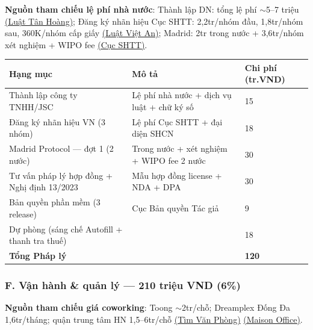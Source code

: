 \documentclass[11pt,a4paper]{article}
\begin{document}
\textbf{Nguồn tham chiếu lệ phí nhà nước}: Thành lập DN: tổng lệ phí $\sim$5--7 triệu \href{https://luattanhoang.com/chi-phi-thanh-lap-cong-ty.html}{(Luật Tân Hoàng)}; Đăng ký nhãn hiệu Cục SHTT: 2,2tr/nhóm đầu, 1,8tr/nhóm sau, 360K/nhóm cấp giấy \href{https://luatvietan.vn/le-phi-nop-don-dang-ky-nhan-hieu.html}{(Luật Việt An)}; Madrid: 2tr trong nước + 3,6tr/nhóm xét nghiệm + WIPO fee \href{https://ipvietnam.gov.vn/en/nhan-hieu}{(Cục SHTT)}.

\begin{longtable}{|L{4cm}|L{6cm}|R{2.2cm}|}
\hline
{}\textbf{Hạng mục} & \textbf{Mô tả} & \textbf{Chi phí (tr.VND)} \\
\hline\endhead

Thành lập công ty TNHH/JSC & Lệ phí nhà nước + dịch vụ luật + chữ ký số & 15 \\ \hline
Đăng ký nhãn hiệu VN (3 nhóm) & Lệ phí Cục SHTT + đại diện SHCN & 18 \\ \hline
Madrid Protocol --- đợt 1 (2 nước) & Trong nước + xét nghiệm + WIPO fee 2 nước & 30 \\ \hline
Tư vấn pháp lý hợp đồng + Nghị định 13/2023 & Mẫu hợp đồng license + NDA + DPA & 30 \\ \hline
Bản quyền phần mềm (3 release) & Cục Bản quyền Tác giả & 9 \\ \hline
Dự phòng (sáng chế Autofill + thanh tra thuế) & & 18 \\ \hline
\textbf{Tổng Pháp lý} & & \textbf{120} \\ \hline

\end{longtable}

\subsubsection{F. Vận hành \& quản lý --- 210 triệu VND (6\%)}

\textbf{Nguồn tham chiếu giá coworking}: Toong $\sim$2tr/chỗ; Dreamplex Đống Đa 1,6tr/tháng; quận trung tâm HN 1,5--6tr/chỗ \href{https://timvanphong.com.vn/coworking-space-gia-re-tai-ha-noi/}{(Tìm Văn Phòng)} \href{https://maisonoffice.vn/van-phong-tron-goi/dreamplex-coworking-space/}{(Maison Office)}.
\end{document}
